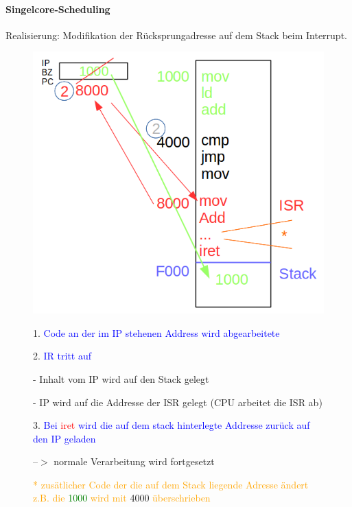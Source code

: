 \documentclass[12pt,a4paper,oneside,ngerman]{article}
\begin{document}
\paragraph{Singelcore-Scheduling}
Realisierung: Modifikation der Rücksprungadresse auf dem Stack beim Interrupt.

\begin{figure}[H]
	\begin{minipage}[t]{6cm}
	\vspace{0pt}
	\centering
	\includegraphics[scale=0.35]{umlet/Singelcore_scheduling.png}
	\end{minipage}
	\hfill
	\begin{minipage}[t]{6cm}
	\vspace{0pt}
	\begin{description}
	\item 1. \textcolor{blue}{Code an der im IP stehenen Address wird abgearbeitete}
	\item 2. \textcolor{blue}{IR tritt auf}
		\begin{description}
			\item - Inhalt vom IP wird auf den Stack gelegt
			\item - IP wird auf die Addresse der ISR gelegt (CPU arbeitet die ISR ab)
		\end{description}
	\item 3. \textcolor{blue}{Bei } \textcolor{red}{iret} \textcolor{blue}{ wird die auf dem stack hinterlegte Addresse zurück auf den IP geladen}
	\item --$>$ normale Verarbeitung wird fortgesetzt
	\end{description}
	\end{minipage}

	\textcolor{orange}{* zusätlicher Code der die auf dem Stack liegende Adresse ändert} \\
	\textcolor{orange}{z.B. die} \textcolor{green}{1000} \textcolor{orange} {wird mit} 4000 \textcolor{orange}{überschrieben} \\
\end{figure}
\end{document}
